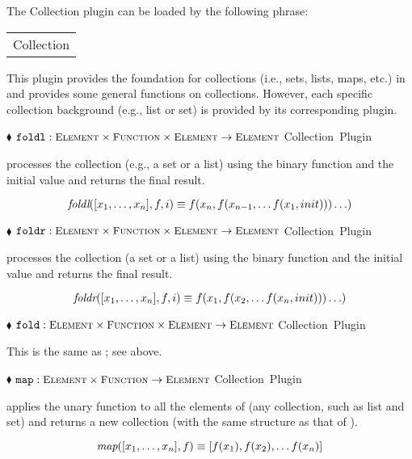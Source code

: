 \documentclass{article}
\newcommand{\codebf}[1]{\xspace{\bf \code{#1}}\xspace}
\newcommand{\keyword}[1]{\codebf{#1}}
\newcommand{\funcform}[2]{\pform{$\blacklozenge$}{#1}{#2}}
\newcommand{\pform}[3]{\vspace*{4mm} \noindent #1 #2 \vspace{1mm}\textcolor[gray]{0.7}{\dotfill}\mbox{{\sffamily \footnotesize #3}}}
\newcommand{\bExample}{\begin{small} \vspace{0.3cm} \begin{tabular}{|l} \begin{minipage}{0.85\textwidth} \vspace{0.2cm} \ttfamily}
\newcommand{\eExample}{\vspace{0.2cm} \end{minipage} \end{tabular} \vspace{0.3cm} \end{small}}
\begin{document}
The Collection plugin can be loaded by the following \keyword{use} phrase:

\bExample
	\codebf{use} Collection
\eExample

This plugin provides the foundation for collections (i.e., sets, lists, maps, etc.) in \CoreASM and provides some general functions 
on collections. However, each specific collection background (e.g., list or set) is provided by its corresponding plugin. 

\funcform{$\mbox{{\ttfamily foldl}} : \mbox{\scshape\small Element} \times \mbox{\scshape\small Function} \times \mbox{\scshape\small Element} \rightarrow \mbox{\scshape\small Element}$}{Collection Plugin}

 processes the collection  (e.g., a set or a list) using the binary function  and the initial value  and returns the final result.

\[ \mbox{\it foldl} ([x_1,\ldots,x_n], f, i) \equiv f(x_n, f(x_{n-1}, \ldots f(x_1, init))) \ldots ) \] 
 
\funcform{$\mbox{{\ttfamily foldr}} : \mbox{\scshape\small Element} \times \mbox{\scshape\small Function} \times \mbox{\scshape\small Element} \rightarrow \mbox{\scshape\small Element}$}{Collection Plugin}

 processes the collection  (a set or a list)
using the binary function  and the initial value
 and returns the final result.

\[ \mbox{\it foldr} ([x_1,\ldots,x_n], f, i) \equiv f(x_1, f(x_2, \ldots f(x_n, init))) \ldots ) \] 
 
\funcform{$\mbox{{\ttfamily fold}} : \mbox{\scshape\small Element} \times \mbox{\scshape\small Function} \times \mbox{\scshape\small Element} \rightarrow \mbox{\scshape\small Element}$}{Collection Plugin}

This is the same as ; see above.

\funcform{$\mbox{{\ttfamily map}} : \mbox{\scshape\small Element} \times \mbox{\scshape\small Function} \rightarrow \mbox{\scshape\small Element}$}{Collection Plugin}

 applies the unary function  to all the elements of  (any collection, such as list and set) 
and returns a new collection (with the same structure as that of ).  

\[ \mbox{\it map} ([x_1,\ldots,x_n], f) \equiv [ f(x_1), f(x_2), \ldots f(x_n) ] \] 
\end{document}
